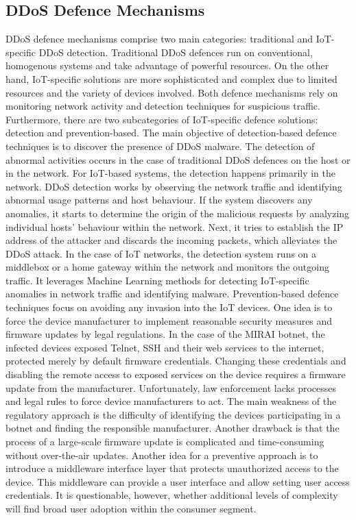 \documentclass[conference, 11pt]{IEEEtran}
\begin{document}
\subsection{DDoS Defence Mechanisms}
DDoS defence mechanisms comprise two main categories: traditional and IoT-specific DDoS detection.
Traditional DDoS defences run on conventional, homogenous systems and take advantage of powerful resources.
On the other hand, IoT-specific solutions are more sophisticated and complex due to limited resources and the variety of devices involved.
Both defence mechanisms rely on monitoring network activity and detection techniques for suspicious traffic.
Furthermore, there are two subcategories of IoT-specific defence solutions: detection and prevention-based.
The main objective of detection-based defence techniques is to discover the presence of DDoS malware.
The detection of abnormal activities occurs in the case of traditional DDoS defences on the host or in the network.
For IoT-based systems, the detection happens primarily in the network.
DDoS detection works by observing the network traffic and identifying abnormal usage patterns and host behaviour.
If the system discovers any anomalies, it starts to determine the origin of the malicious requests by analyzing individual hosts' behaviour within the network.
Next, it tries to establish the IP address of the attacker and discards the incoming packets, which alleviates the DDoS attack.
In the case of IoT networks, the detection system runs on a middlebox or a home gateway within the network and monitors the outgoing traffic.
It leverages Machine Learning methods for detecting IoT-specific anomalies in network traffic and identifying malware.
Prevention-based defence techniques focus on avoiding any invasion into the IoT devices.
One idea is to force the device manufacturer to implement reasonable security measures and firmware updates by legal regulations.
In the case of the MIRAI botnet, the infected devices exposed Telnet, SSH and their web services to the internet, protected merely by default firmware credentials.
Changing these credentials and disabling the remote access to exposed services on the device requires a firmware update from the manufacturer.
Unfortunately, law enforcement lacks processes and legal rules to force device manufacturers to act.
The main weakness of the regulatory approach is the difficulty of identifying the devices participating in a botnet and finding the responsible manufacturer.
Another drawback is that the process of a large-scale firmware update is complicated and time-consuming without over-the-air updates.
Another idea for a preventive approach is to introduce a middleware interface layer that protects unauthorized access to the device.
This middleware can provide a user interface and allow setting user access credentials.
It is questionable, however, whether additional levels of complexity will find broad user adoption within the consumer segment.
\end{document}
